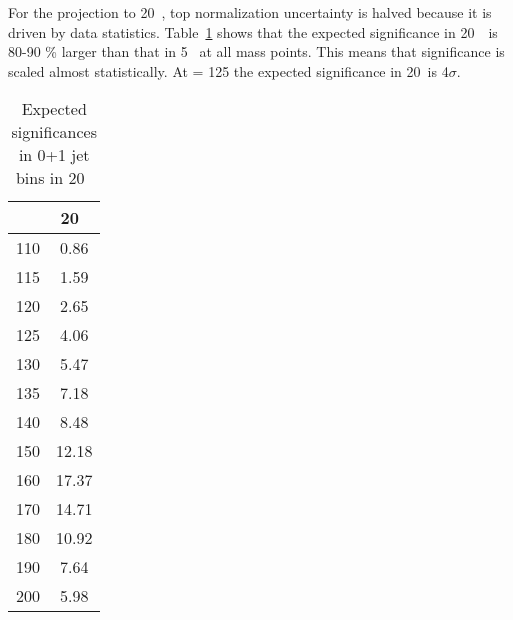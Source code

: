 For the projection to 20~\ifb, top normalization uncertainty is halved
because it is driven by data statistics. Table~\ref{tab:exp_sig_20fb} shows
that the expected significance in 20~\ifb~is 80-90 \% larger than that in 5~\ifb
at all mass points. This means that significance is scaled almost statistically.
At \mHi = 125 \GeV the expected  significance in 20~\ifb is 4$\sigma$.

\begin{table}[htb] 
	\centering
	\begin{tabular}{c | c  }
   	\hline \hline
	\mHi & 20~\ifb \\
	\hline 
	110 & 	 0.86	\\
	115 & 	 1.59   \\
	120 & 	 2.65   \\
	125 & 	 4.06   \\
	130 & 	 5.47   \\
	135 & 	 7.18   \\
	140 & 	 8.48   \\
	150 & 	 12.18   \\
	160 & 	 17.37   \\
	170 & 	 14.71   \\
	180 & 	 10.92   \\
	190 & 	 7.64   \\
	200 & 	 5.98   \\
	\hline \hline
	\end{tabular}
	\caption{Expected significances in 0+1 jet bins in 20~\ifb}
	\label{tab:exp_sig_20fb}
\end{table} 
